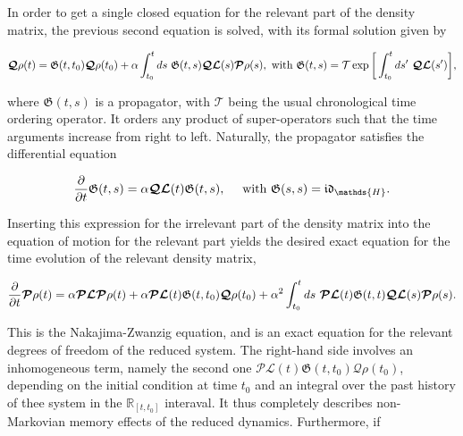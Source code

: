 \documentclass{homework}
\begin{document}
In order to get a single closed equation for the relevant part of the density matrix, the previous second equation is solved, with its formal solution given by 

\begin{equation}
    \bm{\mathcal{Q}} \rho(t) = \mathfrak{G}(t,t_0) \bm{\mathcal{Q}} \rho(t_0) + \alpha \int_{t_0}^{t} ds \textnormal{ } \mathfrak{G}(t,s) \bm{\mathcal{Q}} \bm{\mathcal{L}}(s) \bm{\mathcal{P}} \rho(s), \textnormal{ with } \mathfrak{G}(t,s) = \mathcal{T} \exp \bigg[\int_{t_0}^{t} ds' \textnormal{ } \bm{\mathcal{Q}} \bm{\mathcal{L}}(s')\bigg],
    \label{Green_propagator_Nakajima_Zwanzing}
\end{equation}

where $\mathfrak{G}(t,s)$ is a propagator, with $\mathcal{T}$ being the usual chronological time ordering operator. It orders any product of super-operators such that the time arguments increase from right to left. Naturally, the propagator satisfies the differential equation 

\begin{equation}
    \frac{\partial}{\partial t}\mathfrak{G}(t,s) = \alpha \bm{\mathcal{Q}} \bm{\mathcal{L}}(t) \mathfrak{G}(t,s), \quad \textnormal{ with } \mathfrak{G}(s,s) = \mathfrak{i}\mathfrak{d}_{\mathds{H}}.
\end{equation}

Inserting this expression for the irrelevant part of the density matrix into the equation of motion for the relevant part yields the desired exact equation for the time evolution of the relevant density matrix,

\begin{equation}
    \frac{\partial}{\partial t} \bm{\mathcal{P}}\rho(t) = \alpha \bm{\mathcal{P}} \bm{\mathcal{L}} \bm{\mathcal{P}} \rho(t) + \alpha \bm{\mathcal{P}}  \bm{\mathcal{L}}(t) \mathfrak{G}(t, t_0)  \bm{\mathcal{Q}} \rho(t_0) + \alpha^2 \int_{t_0}^{t} ds \textnormal{ } \bm{\mathcal{P}} \bm{\mathcal{L}}(t) \mathfrak{G}({t},t) \bm{\mathcal{Q}} \bm{\mathcal{L}}(s) \bm{\mathcal{P}} \rho(s).  
    \label{Nakajima_Zwanzig_exact}
\end{equation}

This is the Nakajima-Zwanzig equation, and is an exact equation for the relevant degrees of freedom of the reduced system. The right-hand side involves an inhomogeneous term, namely the second one $\bm{\mathcal{P}}  \bm{\mathcal{L}}(t) \mathfrak{G}(t, t_0)  \bm{\mathcal{Q}} \rho(t_0)$, depending on the initial condition at time $t_0$ and an integral over the past history of thee system in the $\mathds{R}_{[t, t_0]}$ interaval. It thus completely describes non-Markovian memory effects of the reduced dynamics. Furthermore, if 
\end{document}
